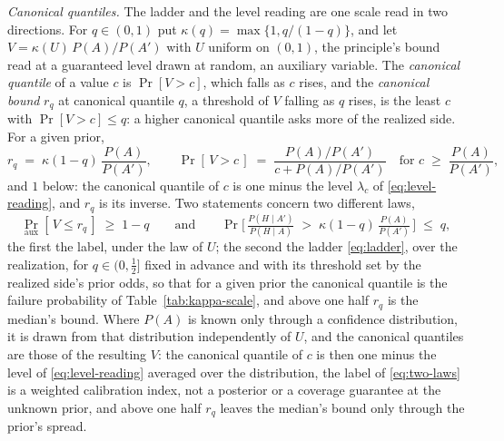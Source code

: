 \textit{Canonical quantiles.} The ladder and the level reading are one scale read in two directions. For $q \in (0,1)$ put $\kappa(q) = \max\{1, q/(1-q)\}$, and let $V = \kappa(U)\, P(A)/P(A')$ with $U$ uniform on $(0,1)$, the principle's bound read at a guaranteed level drawn at random, an auxiliary variable. The \emph{canonical quantile} of a value $c$ is $\Pr[V > c]$, which falls as $c$ rises, and the \emph{canonical bound} $r_q$ at canonical quantile $q$, a threshold of $V$ falling as $q$ rises, is the least $c$ with $\Pr[V > c] \le q$: a higher canonical quantile asks more of the realized side. For a given prior,
\begin{equation}
\label{eq:canonical-quantile}
r_q \;=\; \kappa(1-q)\, \frac{P(A)}{P(A')}, \qquad \Pr[\,V > c\,] \;=\; \frac{P(A)/P(A')}{c + P(A)/P(A')} \quad \text{for } c \;\ge\; \frac{P(A)}{P(A')},
\end{equation}
and $1$ below: the canonical quantile of $c$ is one minus the level $\lambda_c$ of \eqref{eq:level-reading}, and $r_q$ is its inverse. Two statements concern two different laws,
\begin{equation}
\label{eq:two-laws}
\Pr_{\mathrm{aux}}[\, V \le r_q \,] \;\ge\; 1-q \qquad\text{and}\qquad \Pr\!\Big[\, \tfrac{P(H \mid A')}{P(H \mid A)} \;>\; \kappa(1-q)\, \tfrac{P(A)}{P(A')} \,\Big] \;\le\; q,
\end{equation}
the first the label, under the law of $U$; the second the ladder \eqref{eq:ladder}, over the realization, for $q \in (0, \tfrac12]$ fixed in advance and with its threshold set by the realized side's prior odds, so that for a given prior the canonical quantile is the failure probability of Table~\ref{tab:kappa-scale}, and above one half $r_q$ is the median's bound. Where $P(A)$ is known only through a confidence distribution, it is drawn from that distribution independently of $U$, and the canonical quantiles are those of the resulting $V$: the canonical quantile of $c$ is then one minus the level of \eqref{eq:level-reading} averaged over the distribution, the label of \eqref{eq:two-laws} is a weighted calibration index, not a posterior or a coverage guarantee at the unknown prior, and above one half $r_q$ leaves the median's bound only through the prior's spread.

